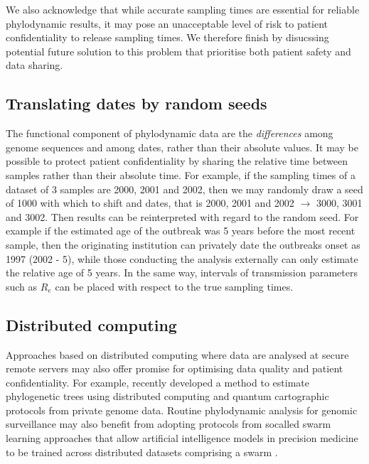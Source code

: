 \documentclass[11pt]{article}
\begin{document}
\begin{spacing}{1.5}
We also acknowledge that while accurate sampling times are essential for reliable phylodynamic results, it may pose an unacceptable level of risk to patient confidentiality to release sampling times. We therefore finish by disucssing potential future solution to this problem that prioritise both patient safety and data sharing.

\subsection*{Translating dates by random seeds}
The functional component of phylodynamic data are the \emph{differences} among genome sequences and among dates, rather than their absolute values. It may be possible to protect patient confidentiality by sharing the relative time between samples rather than their absolute time. For example, if the sampling times of a dataset of 3 samples are 2000, 2001 and 2002, then we may randomly draw a seed of 1000 with which to shift and dates, that is 2000, 2001 and 2002 $\rightarrow$ 3000, 3001 and 3002. Then results can be reinterpreted with regard to the random seed. For example if the estimated age of the outbreak was 5 years before the most recent sample, then the originating institution can privately date the outbreaks onset as 1997 (2002 - 5), while those conducting the analysis externally can only estimate the relative age of 5 years. In the same way, intervals of transmission parameters such as $R_e$ can be placed with respect to the true sampling times.

\subsection*{Distributed computing}
Approaches based on distributed computing where data are analysed at secure remote servers may also offer promise for optimising data quality and patient confidentiality. For example, \citet{santos_private_2022} recently developed a method to estimate phylogenetic trees using distributed computing and quantum cartographic protocols from private genome data. Routine phylodynamic analysis for genomic surveillance may also benefit from adopting protocols from socalled swarm learning approaches that allow artificial intelligence models in precision medicine to be trained across distributed datasets comprising a swarm \citep{warnat-herresthal_swarm_2021}.

\end{spacing}



\end{document}
